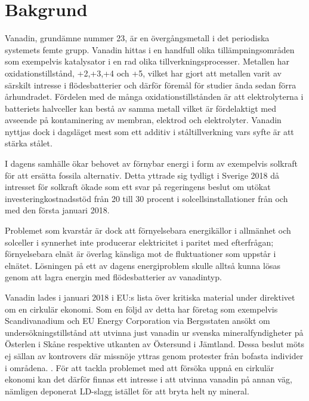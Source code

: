 \section{Bakgrund}

Vanadin, grundämne nummer 23, är en övergångsmetall i det periodiska systemets femte grupp. Vanadin hittas i en handfull olika tillämpningsområden som exempelvis katalysator i en rad olika tillverkningsprocesser\cite{Pecoraro2014}.
Metallen har oxidationstillstånd, +2,+3,+4 och +5,  \cite{Baroch2013} vilket har gjort att metallen varit av särskilt intresse i flödesbatterier och därför föremål för studier ända sedan förra århundradet\cite{Skyllas-Kazacos1987}.
Fördelen med de många oxidationstillstånden är att elektrolyterna i batteriets halvceller kan bestå av samma metall vilket är fördelaktigt med avseende på kontaminering av membran, elektrod och elektrolyter\cite{Lopez-Vizcaino2017}. Vanadin nyttjas dock i dagsläget mest som ett additiv i ståltillverkning vars syfte är att stärka stålet\cite{Baroch2013}.

I dagens samhälle ökar behovet av förnybar energi i form av exempelvis solkraft för att ersätta fossila alternativ. Detta yttrade sig tydligt i Sverige 2018 då intresset för solkraft ökade som ett svar på regeringens beslut om utökat investeringkostnadsstöd från 20 till 30 procent i solcellsinstallationer från och med den första januari 2018\cite{SverigesEnergimybn2009}.

Problemet som kvarstår är dock att förnyelsebara energikällor i allmänhet och solceller i synnerhet inte producerar elektricitet i paritet med efterfrågan; förnyelsebara elnät är överlag känsliga mot de fluktuationer som uppstår i elnätet. Lösningen på ett av dagens energiproblem skulle alltså kunna lösas genom att lagra energin med flödesbatterier av vanadintyp\cite{Lopez-Vizcaino2017}.


Vanadin lades i januari 2018 i EU:s lista över kritiska material under direktivet om en cirkulär ekonomi\cite{Navigation2018}. 
Som en följd av detta har företag som exempelvis Scandivanadium och EU Energy Corporation via Bergsstaten ansökt om undersökningstillstånd att utvinna just vanadin ur svenska mineralfyndigheter på Österlen i Skåne respektive utkanten av Östersund i Jämtland. Dessa beslut möts ej sällan av kontrovers där missnöje yttras genom protester från bofasta individer i områdena. \cite{NohrstedtLinda2018}. 
För att tackla problemet med att försöka uppnå en cirkulär ekonomi kan det därför finnas ett intresse i att utvinna vanadin på annan väg, nämligen deponerat LD-slagg istället för att bryta helt ny mineral.

